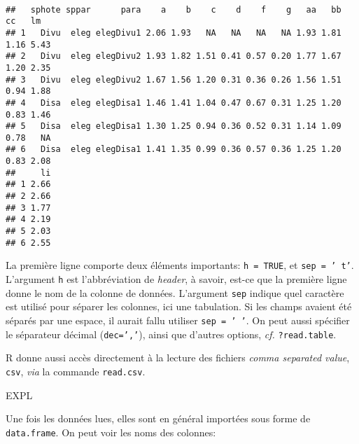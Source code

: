 \begin{knitrout}
\color{fgcolor}\begin{kframe}
\begin{flushleft}
\ttfamily\noindent
{}\hlassignement{\usebox{\hlnormalsizeboxlessthan}-}{\ }\hlkeyword{(}\hlkeyword{,}{\ }\hlargument{=}{\ }\hlkeyword{,}{\ }\hlargument{=}{\ }\hlkeyword{)}\hspace*{\fill}\\
\hlstd{}\hlkeyword{(}\hlkeyword{)}\mbox{}
\normalfont
\end{flushleft}
\begin{verbatim}
##   sphote sppar      para    a    b    c    d    f    g   aa   bb   cc   lm
## 1   Divu  eleg elegDivu1 2.06 1.93   NA   NA   NA   NA 1.93 1.81 1.16 5.43
## 2   Divu  eleg elegDivu2 1.93 1.82 1.51 0.41 0.57 0.20 1.77 1.67 1.20 2.35
## 3   Divu  eleg elegDivu2 1.67 1.56 1.20 0.31 0.36 0.26 1.56 1.51 0.94 1.88
## 4   Disa  eleg elegDisa1 1.46 1.41 1.04 0.47 0.67 0.31 1.25 1.20 0.83 1.46
## 5   Disa  eleg elegDisa1 1.30 1.25 0.94 0.36 0.52 0.31 1.14 1.09 0.78   NA
## 6   Disa  eleg elegDisa1 1.41 1.35 0.99 0.36 0.57 0.36 1.25 1.20 0.83 2.08
##     li
## 1 2.66
## 2 2.66
## 3 1.77
## 4 2.19
## 5 2.03
## 6 2.55
\end{verbatim}
\end{kframe}
\end{knitrout}


La première ligne comporte deux éléments importants: \texttt{h = TRUE}, et \texttt{sep = '\ t'}.
L'argument \texttt{h} est l'abbréviation de \emph{header}, à savoir, est-ce que la première ligne donne le nom de la colonne de données.
L'argument \texttt{sep} indique quel caractère est utilisé pour séparer les colonnes, ici une tabulation.
Si les champs avaient été séparés par une espace, il aurait fallu utiliser \texttt{sep = ' '}.
On peut aussi spécifier le séparateur décimal (\texttt{dec=','}), ainsi que d'autres options, \emph{cf.} \texttt{?read.table}.

R donne aussi accès directement à la lecture des fichiers \emph{comma separated value}, \texttt{csv}, \emph{via} la commande \texttt{read.csv}.

EXPL

Une fois les données lues, elles sont en général importées sous forme de \texttt{data.frame}.
On peut voir les noms des colonnes:

